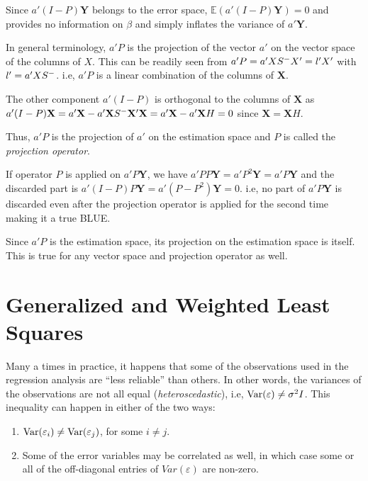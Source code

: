 \documentclass[10pt, a4paper]{article}
\begin{document}
Since \( a'(I-P)\mathbf{Y} \) belongs to the error space, \( \mathbb{E}(a'(I-P)\mathbf{Y}) = 0 \) and provides no information on \( \beta \) and simply inflates the variance of \( a'\mathbf{Y} \).

In general terminology, \( a'P \) is the projection of the vector \( a' \) on the vector space of the columns of \( X \). This can be readily seen from \( a'P = a'XS^{-}X' = l'X' \) with \( l' = a'XS^{-} \). i.e, \( a'P \) is a linear combination of the columns of \( \mathbf{X} \).

The other component \( a'(I-P) \) is orthogonal to the columns of \( \mathbf{X} \) as \( a'(I-P)\mathbf{X} = a'\mathbf{X} - a'\mathbf{X}S^{-}\mathbf{X}'\mathbf{X} = a'\mathbf{X} - a'\mathbf{X}H = 0\) since \( \mathbf{X} = \mathbf{X}H \).

Thus, \( a'P \) is the projection of \( a' \) on the estimation space and \( P \) is called the \textit{projection operator}.

\begin{remark}
If operator \( P \) is applied on \( a'P \mathbf{Y} \), we have \( a'PP \mathbf{Y} = a'P^{2}\mathbf{Y} = a'P \mathbf{Y} \) and the discarded part is \( a'(I-P)P \mathbf{Y} = a'(P - P^{2})\mathbf{Y} = 0 \). 
i.e, no part of \( a'P \mathbf{Y} \) is discarded even after the projection operator is applied for the second time making it a true BLUE.
\end{remark}

Since \( a'P \) is the estimation space, its projection on the estimation space is itself.
This is true for any vector space and projection operator as well.

\section{Generalized and Weighted Least Squares}
Many a times in practice, it happens that some of the observations used in the regression analysis are ``less reliable'' than others. 
In other words, the variances of the observations are not all equal (\textit{heteroscedastic}), i.e, \( \operatorname{Var}(\varepsilon) \neq \sigma^{2}I \).
This inequality can happen in either of the two ways:
\begin{enumerate}[1.]
	\item \( \operatorname{Var}(\varepsilon_{i}) \neq \operatorname{Var}(\varepsilon_{j}) \), for some \( i \neq j \). 
	\item Some of the error variables may be correlated as well, in which case some or all of the off-diagonal
	entries of \( Var(\varepsilon) \) are non-zero.
\end{enumerate}
\end{document}
